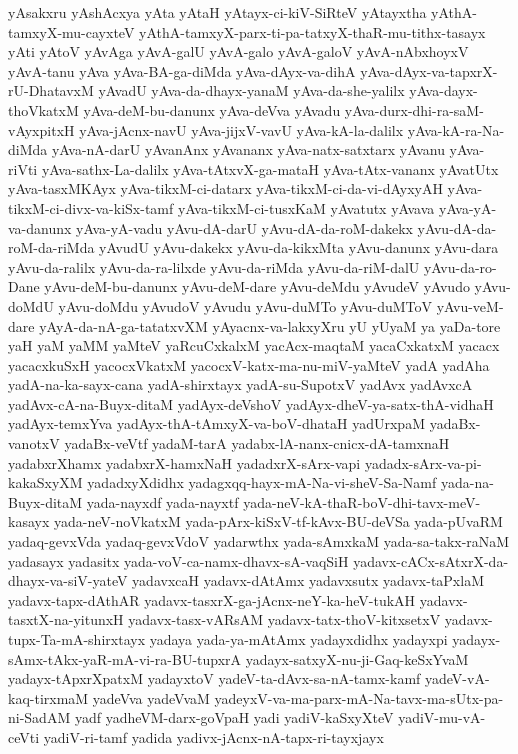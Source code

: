 {yAsakxru
yAshAcxya
yAta
yAtaH
yAtayx-ci-kiV-SiRteV
yAtayxtha
yAthA-tamxyX-mu-cayxteV
yAthA-tamxyX-parx-ti-pa-tatxyX-thaR-mu-tithx-tasayx
yAti
yAtoV
yAvAga
yAvA-galU
yAvA-galo
yAvA-galoV
yAvA-nAbxhoyxV
yAvA-tanu
yAva
yAva-BA-ga-diMda
yAva-dAyx-va-dihA
yAva-dAyx-va-tapxrX-rU-DhatavxM
yAvadU
yAva-da-dhayx-yanaM
yAva-da-she-yalilx
yAva-dayx-thoVkatxM
yAva-deM-bu-danunx
yAva-deVva
yAvadu
yAva-durx-dhi-ra-saM-vAyxpitxH
yAva-jAcnx-navU
yAva-jijxV-vavU
yAva-kA-la-dalilx
yAva-kA-ra-Na-diMda
yAva-nA-darU
yAvanAnx
yAvananx
yAva-natx-satxtarx
yAvanu
yAva-riVti
yAva-sathx-La-dalilx
yAva-tAtxvX-ga-mataH
yAva-tAtx-vananx
yAvatUtx
yAva-tasxMKAyx
yAva-tikxM-ci-datarx
yAva-tikxM-ci-da-vi-dAyxyAH
yAva-tikxM-ci-divx-va-kiSx-tamf
yAva-tikxM-ci-tusxKaM
yAvatutx
yAvava
yAva-yA-va-danunx
yAva-yA-vadu
yAvu-dA-darU
yAvu-dA-da-roM-dakekx
yAvu-dA-da-roM-da-riMda
yAvudU
yAvu-dakekx
yAvu-da-kikxMta
yAvu-danunx
yAvu-dara
yAvu-da-ralilx
yAvu-da-ra-lilxde
yAvu-da-riMda
yAvu-da-riM-dalU
yAvu-da-ro-Dane
yAvu-deM-bu-danunx
yAvu-deM-dare
yAvu-deMdu
yAvudeV
yAvudo
yAvu-doMdU
yAvu-doMdu
yAvudoV
yAvudu
yAvu-duMTo
yAvu-duMToV
yAvu-veM-dare
yAyA-da-nA-ga-tatatxvXM
yAyacnx-va-lakxyXru
yU
yUyaM
ya
yaDa-tore
yaH
yaM
yaMM
yaMteV
yaRcuCxkalxM
yacAcx-maqtaM
yacaCxkatxM
yacacx
yacacxkuSxH
yacocxVkatxM
yacocxV-katx-ma-nu-miV-yaMteV
yadA
yadAha
yadA-na-ka-sayx-cana
yadA-shirxtayx
yadA-su-SupotxV
yadAvx
yadAvxcA
yadAvx-cA-na-Buyx-ditaM
yadAyx-deVshoV
yadAyx-dheV-ya-satx-thA-vidhaH
yadAyx-temxYva
yadAyx-thA-tAmxyX-va-boV-dhataH
yadUrxpaM
yadaBx-vanotxV
yadaBx-veVtf
yadaM-tarA
yadabx-lA-nanx-cnicx-dA-tamxnaH
yadabxrXhamx
yadabxrX-hamxNaH
yadadxrX-sArx-vapi
yadadx-sArx-va-pi-kakaSxyXM
yadadxyXdidhx
yadagxqq-hayx-mA-Na-vi-sheV-Sa-Namf
yada-na-Buyx-ditaM
yada-nayxdf
yada-nayxtf
yada-neV-kA-thaR-boV-dhi-tavx-meV-kasayx
yada-neV-noVkatxM
yada-pArx-kiSxV-tf-kAvx-BU-deVSa
yada-pUvaRM
yadaq-gevxVda
yadaq-gevxVdoV
yadarwthx
yada-sAmxkaM
yada-sa-takx-raNaM
yadasayx
yadasitx
yada-voV-ca-namx-dhavx-sA-vaqSiH
yadavx-cACx-sAtxrX-da-dhayx-va-siV-yateV
yadavxcaH
yadavx-dAtAmx
yadavxsutx
yadavx-taPxlaM
yadavx-tapx-dAthAR
yadavx-tasxrX-ga-jAcnx-neY-ka-heV-tukAH
yadavx-tasxtX-na-yitunxH
yadavx-tasx-vARsAM
yadavx-tatx-thoV-kitxsetxV
yadavx-tupx-Ta-mA-shirxtayx
yadaya
yada-ya-mAtAmx
yadayxdidhx
yadayxpi
yadayx-sAmx-tAkx-yaR-mA-vi-ra-BU-tupxrA
yadayx-satxyX-nu-ji-Gaq-keSxYvaM
yadayx-tApxrXpatxM
yadayxtoV
yadeV-ta-dAvx-sa-nA-tamx-kamf
yadeV-vA-kaq-tirxmaM
yadeVva
yadeVvaM
yadeyxV-va-ma-parx-mA-Na-tavx-ma-sUtx-pa-ni-SadAM
yadf
yadheVM-darx-goVpaH
yadi
yadiV-kaSxyXteV
yadiV-mu-vA-ceVti
yadiV-ri-tamf
yadida
yadivx-jAcnx-nA-tapx-ri-tayxjayx
}
